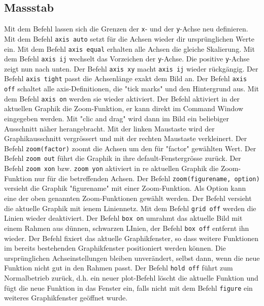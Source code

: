 \subsection{Massstab}
Mit dem Befehl  lassen sich die Grenzen der \texttt{x}- und der \texttt{y}-Achse neu definieren. Mit dem Befehl {\color{red}\texttt{axis auto}} setzt für die Achsen wieder dir ursprünglichen Werte ein. Mit dem Befehl {\color{red}\texttt{axis equal}} erhalten alle Achsen die gleiche Skalierung. Mit dem Befehl {\color{red}\texttt{axis ij}} wechselt das Vorzeichen der \texttt{y}-Achse. Die positive \texttt{y}-Achse zeigt nun nach unten. Der Befehl {\color{red}\texttt{axis xy}} macht {\color{red}\texttt{axis ij}} wieder rückgängig. Der Befehl {\color{red}\texttt{axis tight}} passt die Achsenlänge exakt dem Bild an. Der Befehl {\color{red}\texttt{axis off}} schaltet alle axis-Definitionen, die "tick marks" und den Hintergrund aus. Mit dem Befehl {\color{red}\texttt{axis on}} werden sie wieder aktiviert.
\newline\newline
Der Befehl  aktiviert in der aktuellen Graphik die Zoom-Funktion, er kann direkt im Command Window eingegeben werden. Mit "clic and drag" wird dann im Bild ein beliebiger Ausschnitt näher herangebracht. Mit der linken Maustaste wird der Graphikausschnitt vergrössert und mit der rechten Maustaste verkleinert. Der Befehl {\color{red}\texttt{zoom(factor)}} zoomt die Achsen um den für "factor" gewählten Wert. Der Befehl {\color{red}\texttt{zoom out}} führt die Graphik in ihre default-Fenstergrösse zurück. Der Befehl {\color{red}\texttt{zoom xon}} bzw. {\color{red}\texttt{zoom yon}} aktiviert in re aktuellen Graphik die Zoom-Funktion nur für die betreffenden Achsen. Der Befehl {\color{red}\texttt{zoom(figurename, option)}} versieht die Graphik "figurename" mit einer Zoom-Funktion. Als Option kann eine der oben genannten Zoom-Funktionen gewählt werden.
\newline\newline
Der Befehl  versieht die aktuelle Graphik mit ienem Liniennetz. Mit dem Befehl {\color{red}\texttt{grid off}} werden die Linien wieder deaktiviert. Der Befehl {\color{red}\texttt{box on}} umrahmt das aktuelle Bild mit einem Rahmen aus dünnen, schwarzen LInien, der Befehl {\color{red}\texttt{box off}} entfernt ihn wieder.
\newline\newline
Der Befehl  fixiert das aktuelle Graphikfenster, so dass weitere Funktionen im bereits bestehenden Graphikfenster positioniert werden können. Die ursprünglichen Achseinstellungen bleiben unverändert, selbst dann, wenn die neue Funktion nicht gut in den Rahmen passt. Der Befehl {\color{red}\texttt{hold off}} führt zum Normalbetrieb zurück, d.h. ein neuer plot-Befehl löscht die aktuelle Funktion und fügt die neue Funktion in das Fenster ein, falls nicht mit dem Befehl {\color{red}\texttt{figure}} ein weiteres Graphikfenster geöffnet wurde.
